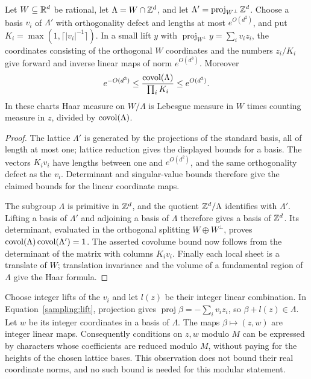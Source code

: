 \begin{lemma}
\label{sampling:lattice-chart}
Let $W\subseteq\mathbb R^d$ be rational, let $\Lambda=W\cap\mathbb Z^d$, and let
$\Lambda'=\operatorname{proj}_{W^\perp}\mathbb Z^d$.  Choose a basis $v_i$ of
$\Lambda'$ with orthogonality defect and lengths at most $e^{O(d^2)}$,
and put $K_i=\max(1,\lceil |v_i|^{-1}\rceil)$.
In a small lift $y$ with $\operatorname{proj}_{W^\perp}y=\sum_iv_iz_i$,
the coordinates consisting of the orthogonal $W$ coordinates and the
numbers $z_i/K_i$ give forward and inverse linear maps of norm $e^{O(d^3)}$.
Moreover
\[
 e^{-O(d^3)}\le\frac{\operatorname{covol}(\Lambda)}{\prod_iK_i}
 \le e^{O(d^3)}.
\]
In these charts Haar measure on $W/\Lambda$ is Lebesgue measure in $W$
times counting measure in $z$, divided by $\operatorname{covol}(\Lambda)$.
\end{lemma}
\begin{proof}
The lattice $\Lambda'$ is generated by the projections of the standard
basis, all of length at most one; lattice reduction gives the displayed
bounds for a basis.  The vectors $K_iv_i$ have lengths between one and
$e^{O(d^2)}$, and the same orthogonality defect as the $v_i$.  Determinant
and singular-value bounds therefore give the claimed bounds for the linear
coordinate maps.

The subgroup $\Lambda$ is primitive in $\mathbb Z^d$, and the quotient
$\mathbb Z^d/\Lambda$ identifies with $\Lambda'$.  Lifting a basis of $\Lambda'$
and adjoining a basis of $\Lambda$ therefore gives a basis of $\mathbb Z^d$.
Its determinant, evaluated in the orthogonal splitting
$W\oplus W^\perp$, proves
$\operatorname{covol}(\Lambda)\operatorname{covol}(\Lambda')=1$.
The asserted covolume bound now follows from the determinant of the matrix
with columns $K_iv_i$.  Finally each local sheet is a translate of $W$;
translation invariance and the volume of a fundamental region of $\Lambda$
give the Haar formula.
\end{proof}

Choose integer lifts of the $v_i$ and let $l(z)$ be their integer linear
combination.  In Equation~\eqref{sampling:lift}, projection gives
$\operatorname{proj}\beta=-\sum_iv_iz_i$, so
$\beta+l(z)\in\Lambda$.  Let $w$ be its integer coordinates in a basis
of $\Lambda$.  The maps $\beta\mapsto(z,w)$ are integer linear maps.
Consequently conditions on $z,w$ modulo $M$ can be expressed by characters
whose coefficients are reduced modulo $M$, without paying for the heights
of the chosen lattice bases.  This observation does not bound their real
coordinate norms, and no such bound is needed for this modular statement.

